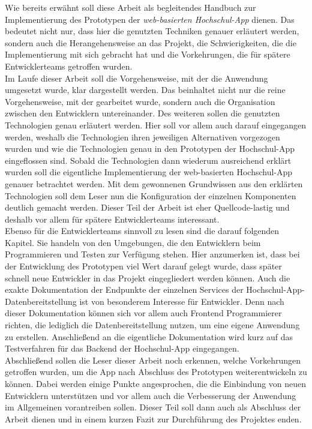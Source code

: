 Wie bereits erwähnt soll diese Arbeit als begleitendes Handbuch zur Implementierung des Prototypen der \textit{web-basierten Hochschul-\ac{App}} dienen. Das bedeutet nicht nur, dass hier die genutzten Techniken genauer erläutert werden, sondern auch die Herangehensweise an das Projekt, die Schwierigkeiten, die die Implementierung mit sich gebracht hat und die Vorkehrungen, die für spätere Entwicklerteams getroffen wurden.\\
\linebreak
Im Laufe dieser Arbeit soll die Vorgehensweise, mit der die Anwendung umgesetzt wurde, klar dargestellt werden. Das beinhaltet nicht nur die reine Vorgehensweise, mit der gearbeitet wurde, sondern auch die Organisation zwischen den Entwicklern untereinander. Des weiteren sollen die genutzten Technologien genau erläutert werden. Hier soll vor allem auch darauf eingegangen werden, weshalb die Technologien ihren jeweiligen Alternativen vorgezogen wurden und wie die Technologien genau in den Prototypen der Hochschul-\ac{App} eingeflossen sind. Sobald die Technologien dann wiederum ausreichend erklärt wurden soll die eigentliche Implementierung der web-basierten Hochschul-\ac{App} genauer betrachtet werden. Mit dem gewonnenen Grundwissen aus den erklärten Technologien soll dem Leser nun die Konfiguration der einzelnen Komponenten deutlich gemacht werden. Dieser Teil der Arbeit ist eher Quellcode-lastig und deshalb vor allem für spätere Entwicklerteams interessant.\\
\linebreak
Ebenso für die Entwicklerteams sinnvoll zu lesen sind die darauf folgenden Kapitel. Sie handeln von den Umgebungen, die den Entwicklern beim Programmieren und Testen zur Verfügung stehen. Hier anzumerken ist, dass bei der Entwicklung des Prototypen viel Wert darauf gelegt wurde, dass später schnell neue Entwickler in das Projekt eingegliedert werden können. Auch die exakte Dokumentation der Endpunkte der einzelnen Services der Hochschul-\ac{App}-Datenbereitstellung ist von besonderem Interesse für Entwickler. Denn nach dieser Dokumentation können sich vor allem auch Frontend Programmierer richten, die lediglich die Datenbereitstellung nutzen, um eine eigene Anwendung zu erstellen. Anschließend an die eigentliche Dokumentation wird kurz auf das Testverfahren für das Backend der Hochschul-\ac{App} eingegangen.\\
\linebreak
Abschließend sollen die Leser dieser Arbeit noch erkennen, welche Vorkehrungen getroffen wurden, um die \ac{App} nach Abschluss des Prototypen weiterentwickeln zu können. Dabei werden einige Punkte angesprochen, die die Einbindung von neuen Entwicklern unterstützen und vor allem auch die Verbesserung der Anwendung im Allgemeinen vorantreiben sollen. Dieser Teil soll dann auch als Abschluss der Arbeit dienen und in einem kurzen Fazit zur Durchführung des Projektes enden.

